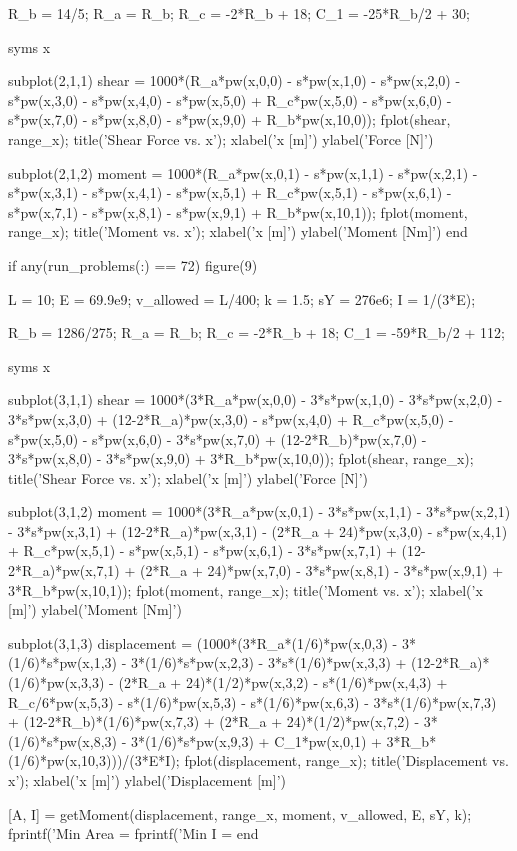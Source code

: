 \documentclass[a4paper]{article}
\begin{document}
\begin{verbatim*}
    R_b = 14/5;
    R_a = R_b;
    R_c = -2*R_b + 18;
    C_1 = -25*R_b/2 + 30;
    
    syms x

    subplot(2,1,1)
    shear = 1000*(R_a*pw(x,0,0) - s*pw(x,1,0) - s*pw(x,2,0) - s*pw(x,3,0) - s*pw(x,4,0) - s*pw(x,5,0) + R_c*pw(x,5,0) - s*pw(x,6,0) - s*pw(x,7,0) - s*pw(x,8,0) - s*pw(x,9,0) + R_b*pw(x,10,0));
    fplot(shear, range_x);
    title('Shear Force vs. x');
    xlabel('x [m]')
    ylabel('Force [N]')

    subplot(2,1,2)
    moment = 1000*(R_a*pw(x,0,1) - s*pw(x,1,1) - s*pw(x,2,1) - s*pw(x,3,1) - s*pw(x,4,1) - s*pw(x,5,1) + R_c*pw(x,5,1) - s*pw(x,6,1) - s*pw(x,7,1) - s*pw(x,8,1) - s*pw(x,9,1) + R_b*pw(x,10,1));
    fplot(moment, range_x);
    title('Moment vs. x');
    xlabel('x [m]')
    ylabel('Moment [Nm]')
end

if any(run_problems(:) == 72)
    figure(9)

    L = 10; %
    E = 69.9e9; %
    v_allowed = L/400; %
    k = 1.5; %
    sY = 276e6; %
    I = 1/(3*E);

    R_b = 1286/275;
    R_a = R_b;
    R_c = -2*R_b + 18;
    C_1 = -59*R_b/2 + 112;
    
    syms x

    subplot(3,1,1)
    shear = 1000*(3*R_a*pw(x,0,0) - 3*s*pw(x,1,0) - 3*s*pw(x,2,0) - 3*s*pw(x,3,0) + (12-2*R_a)*pw(x,3,0) - s*pw(x,4,0) + R_c*pw(x,5,0) - s*pw(x,5,0) - s*pw(x,6,0) - 3*s*pw(x,7,0) + (12-2*R_b)*pw(x,7,0) - 3*s*pw(x,8,0) - 3*s*pw(x,9,0) + 3*R_b*pw(x,10,0));
    fplot(shear, range_x);
    title('Shear Force vs. x');
    xlabel('x [m]')
    ylabel('Force [N]')

    subplot(3,1,2)
    moment = 1000*(3*R_a*pw(x,0,1) - 3*s*pw(x,1,1) - 3*s*pw(x,2,1) - 3*s*pw(x,3,1) + (12-2*R_a)*pw(x,3,1) - (2*R_a + 24)*pw(x,3,0) - s*pw(x,4,1) + R_c*pw(x,5,1) - s*pw(x,5,1) - s*pw(x,6,1) - 3*s*pw(x,7,1) + (12-2*R_a)*pw(x,7,1) + (2*R_a + 24)*pw(x,7,0) - 3*s*pw(x,8,1) - 3*s*pw(x,9,1) + 3*R_b*pw(x,10,1));
    fplot(moment, range_x);
    title('Moment vs. x');
    xlabel('x [m]')
    ylabel('Moment [Nm]')
    
    subplot(3,1,3)
    displacement = (1000*(3*R_a*(1/6)*pw(x,0,3) - 3*(1/6)*s*pw(x,1,3) - 3*(1/6)*s*pw(x,2,3) - 3*s*(1/6)*pw(x,3,3) + (12-2*R_a)*(1/6)*pw(x,3,3) - (2*R_a + 24)*(1/2)*pw(x,3,2) - s*(1/6)*pw(x,4,3) + R_c/6*pw(x,5,3) - s*(1/6)*pw(x,5,3) - s*(1/6)*pw(x,6,3) - 3*s*(1/6)*pw(x,7,3) + (12-2*R_b)*(1/6)*pw(x,7,3) + (2*R_a + 24)*(1/2)*pw(x,7,2) - 3*(1/6)*s*pw(x,8,3) - 3*(1/6)*s*pw(x,9,3) + C_1*pw(x,0,1) + 3*R_b*(1/6)*pw(x,10,3)))/(3*E*I);
    fplot(displacement, range_x);
    title('Displacement vs. x');
    xlabel('x [m]')
    ylabel('Displacement [m]')

    [A, I] = getMoment(displacement, range_x, moment, v_allowed, E, sY, k);
    fprintf('Min Area = %
    fprintf('Min I = %
end
\end{verbatim*}
\end{document}
